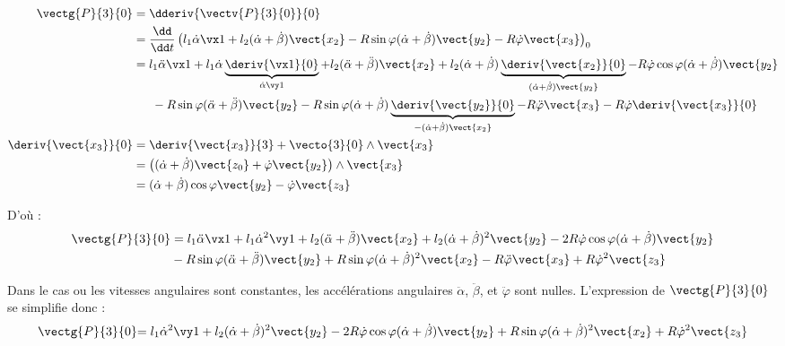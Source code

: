 \ifprof
\begin{corrige}

\begin{align*}
\vectg{P}{3}{0}&=\dderiv{\vectv{P}{3}{0}}{0}\\
	&=\dfrac{\dd}{\dd t}\left( l_1\dot\alpha\vx1+l_2(\dot\alpha+\dot\beta)\vect{x_2}-R\sin\varphi(\dot\alpha+\dot\beta)\vect{y_2}-R\dot\varphi\vect{x_3} \right)_0 \\
	&=l_1 \ddot\alpha\vx1+l_1 \dot\alpha\underbrace{\deriv{\vx1}{0}}_{\dot\alpha\vy1} + l_2(\ddot\alpha + \ddot\beta)\vect{x_2}+ l_2(\dot\alpha+\dot\beta)\underbrace{\deriv{\vect{x_2}}{0}}_{(\dot\alpha+\dot\beta)\vect{y_2}}-R\dot\varphi\cos\varphi(\dot\alpha+\dot\beta)\vect{y_2}\\
	&\phantom{==}-R\sin\varphi(\ddot\alpha+\ddot\beta)\vect{y_2}-R\sin\varphi(\dot\alpha+\dot\beta)\underbrace{\deriv{\vect{y_2}}{0}}_{-(\dot\alpha+\dot\beta)\vect{x_2}}-R\ddot\varphi\vect{x_3} -R\dot\varphi\deriv{\vect{x_3}}{0}\\
\deriv{\vect{x_3}}{0}&={\deriv{\vect{x_3}}{3}}+\vecto{3}{0}\wedge\vect{x_3}\\
		&=\left((\dot\alpha+\dot\beta)\vect{z_0}+\dot\varphi\vect{y_2}\right)\wedge\vect{x_3}\\
		&=(\dot\alpha+\dot\beta)\cos\varphi\vect{y_2}-\dot\varphi\vect{z_3}
		\end{align*}
		
D'où :
\begin{align*}
\vectg{P}{3}{0}&=l_1 \ddot\alpha\vx1+l_1 \dot\alpha^2\vy1 + l_2(\ddot\alpha + \ddot\beta)\vect{x_2}+ l_2(\dot\alpha+\dot\beta)^2\vect{y_2}-2R\dot\varphi\cos\varphi(\dot\alpha+\dot\beta)\vect{y_2}\\
	& -R\sin\varphi(\ddot\alpha+\ddot\beta)\vect{y_2}+R\sin\varphi(\dot\alpha+\dot\beta)^2\vect{x_2}-R\ddot\varphi\vect{x_3} +R\dot\varphi^2\vect{z_3}
\end{align*}


\end{corrige}\else\fi

\ifprof
\begin{corrige}

Dans le cas ou les vitesses angulaires sont constantes, les accélérations angulaires $\ddot\alpha$, $\ddot\beta$, et $\ddot\varphi$ sont nulles. L'expression de $\vectg{P}{3}{0}$ se simplifie donc :
\begin{align*}
{\vectg{P}{3}{0}}{=l_1 \dot\alpha^2\vy1 + l_2(\dot\alpha+\dot\beta)^2\vect{y_2}-2R\dot\varphi\cos\varphi(\dot\alpha+\dot\beta)\vect{y_2}+ R\sin\varphi(\dot\alpha+\dot\beta)^2\vect{x_2} +R\dot\varphi^2\vect{z_3}}\\
\end{align*}

\end{corrige}\else\fi


